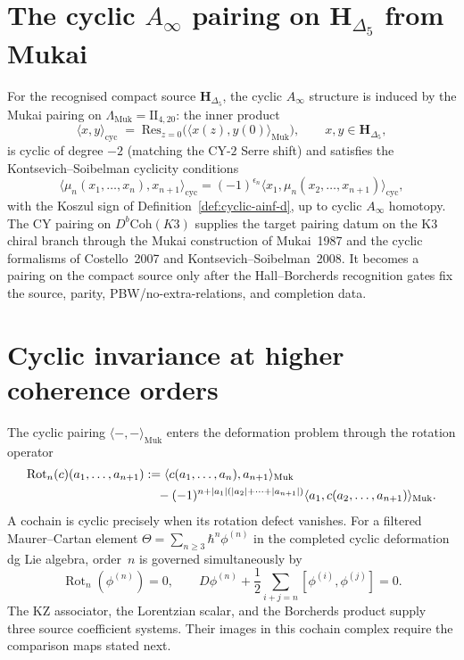 \section{The cyclic \texorpdfstring{$A_\infty$}{A-inf} pairing on \texorpdfstring{$\mathbf H_{\Delta_5}$}{H-Delta-5} from Mukai}
\label{sec:cycainf-mukai-pairing}

\begin{remark}
\label{rem:cycainf-mukai-induced}
For the recognised compact source $\mathbf H_{\Delta_5}$, the cyclic
$A_\infty$ structure is induced by the Mukai pairing on
$\Lambda_{\mathrm{Muk}} = \mathrm{II}_{4,20}$: the
inner product
\[
\langle x, y\rangle_{\mathrm{cyc}} \;=\; \mathrm{Res}_{z=0}\bigl(\langle x(z), y(0)\rangle_{\mathrm{Muk}}\bigr),\qquad x, y\in \mathbf H_{\Delta_5},
\]
is cyclic of degree $-2$ (matching the CY-$2$ Serre shift) and satisfies
the Kontsevich--Soibelman cyclicity conditions
\[
 \langle \mu_n(x_1,\ldots,x_n),x_{n+1}\rangle_{\mathrm{cyc}}
 =
 (-1)^{\epsilon_n}
 \langle x_1,\mu_n(x_2,\ldots,x_{n+1})\rangle_{\mathrm{cyc}},
\]
with the Koszul sign of Definition~\ref{def:cyclic-ainf-d}, up to
cyclic $A_\infty$ homotopy. The CY pairing on $D^b\mathrm{Coh}(K3)$
supplies the target pairing datum on the K3 chiral branch through the
Mukai construction of Mukai~1987 and the cyclic formalisms of
Costello~2007 and Kontsevich--Soibelman~2008. It becomes a pairing on
the compact source only after the Hall--Borcherds recognition gates fix
the source, parity, PBW/no-extra-relations, and completion data.
\end{remark}

\section{Cyclic invariance at higher coherence orders}
\label{sec:cycainf-higher-coherence}

The cyclic pairing $\langle-,-\rangle_{\mathrm{Muk}}$ enters the
deformation problem through the rotation operator
\begin{align}
\label{eq:cycainf-rotation-defect}
 \operatorname{Rot}_n(c)(a_1,\ldots,a_{n+1})
 &:=
 \langle c(a_1,\ldots,a_n),a_{n+1}\rangle_{\mathrm{Muk}}
 \\
 &\quad-
 (-1)^{n+|a_1|(|a_2|+\cdots+|a_{n+1}|)}
 \langle a_1,c(a_2,\ldots,a_{n+1})\rangle_{\mathrm{Muk}}.
 \notag
\end{align}
A cochain is cyclic precisely when its rotation defect vanishes.  For
a filtered Maurer--Cartan element
$\Theta=\sum_{n\geq3}\hbar^n\phi^{(n)}$ in the completed cyclic
deformation dg Lie algebra, order~$n$ is governed simultaneously by
\[
 \operatorname{Rot}_n(\phi^{(n)})=0,
 \qquad
 D\phi^{(n)}
 +\frac12\sum_{i+j=n}[\phi^{(i)},\phi^{(j)}]=0.
\]
The KZ associator, the Lorentzian scalar, and the Borcherds product
supply three source coefficient systems.  Their images in this
cochain complex require the comparison maps stated next.

